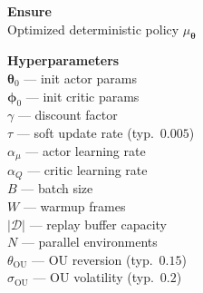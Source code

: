 \documentclass[11pt]{article}
\begin{document}
\begin{algorithm}[p]\small
\caption{DDPG --- Practical Vectorized Implementation}\label{alg:ddpg}
\vspace{2pt}
\noindent
\begin{minipage}[t]{0.28\linewidth}
\renewcommand{\arraystretch}{1.12}
\textbf{Ensure} \\[2pt]
Optimized deterministic policy $\mu_{\boldsymbol{\theta}}$

\vspace{6pt}
\textbf{Hyperparameters} \\[2pt]
$\boldsymbol{\theta}_0$ --- init actor params \\
$\boldsymbol{\phi}_0$ --- init critic params \\
$\gamma$ --- discount factor \\
$\tau$ --- soft update rate (typ.\ $0.005$) \\
$\alpha_\mu$ --- actor learning rate \\
$\alpha_Q$ --- critic learning rate \\
$B$ --- batch size \\
$W$ --- warmup frames \\
$|\mathcal{D}|$ --- replay buffer capacity \\
$N$ --- parallel environments \\
$\theta_{\text{OU}}$ --- OU reversion (typ.\ $0.15$) \\
$\sigma_{\text{OU}}$ --- OU volatility (typ.\ $0.2$)


\end{minipage}
\end{algorithm}
\end{document}
